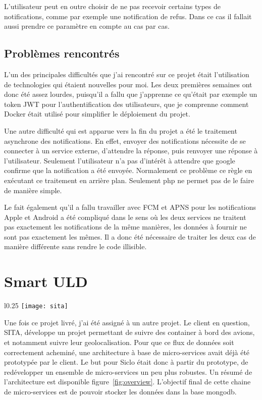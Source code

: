 \documentclass[rapport.tex]{subfiles}
\begin{document}
        L'utilisateur peut en outre choisir de ne pas recevoir certains types de notifications, comme par exemple une notification de refus.
        Dans ce cas il fallait aussi prendre ce paramètre en compte au cas par cas.

        \subsection{Problèmes rencontrés}
        L'un des principales difficultés que j'ai rencontré sur ce projet était
        l'utilisation de technologies qui étaient nouvelles pour moi.
        Les deux premières semaines ont donc été assez lourdes, puisqu'il a
        fallu que j'apprenne ce qu'était par exemple un token JWT pour
        l'authentification des utilisateurs, que je comprenne comment Docker
        était utilisé pour simplifier le déploiement du projet.

        Une autre difficulté qui est apparue vers la fin du projet a été le
        traitement asynchrone des notifications. En effet, envoyer des
        notifications nécessite de se connecter à un service externe,
        d'attendre la réponse, puis renvoyer une réponse à l'utilisateur.
        Seulement l'utilisateur n'a pas d'intérêt à attendre que google
        confirme que la notification a été envoyée. Normalement ce problème ce
        règle en exécutant ce traitement en arrière plan. Seulement php ne
        permet pas de le faire de manière simple.

        Le fait également qu'il a fallu travailler avec FCM et APNS pour les
        notifications Apple et Android a été compliqué dans le sens où les deux
        services ne traitent pas exactement les notifications de la même
        manières, les données à fournir ne sont pas exactement les mêmes. Il a
        donc été nécessaire de traiter les deux cas de manière différente sans
        rendre le code illisible.

        \section{Smart ULD}
        \begin{wrapfigure}{l}{0.25\textwidth}
            \centering
            \texttt{[image: sita]}
        \end{wrapfigure}
        Une fois ce projet livré, j'ai été assigné à un autre projet.
        Le client en question, SITA,  développe un projet permettant de suivre des container
        à bord des avions, et notamment suivre leur geolocalisation.
        Pour que ce flux de données soit correctement acheminé, une architecture à base de micro-services
        avait déjà été prototypée par le client. Le but pour Siclo était donc à
        partir du prototype, de 
        redévelopper un ensemble de micro-services un peu plus robustes. Un
        résumé de l'architecture est disponible figure~\ref{fig:overview}. L'objectif final de cette chaine de micro-services est de pouvoir stocker les données dans la base mongodb.
        \sub
\end{document}
